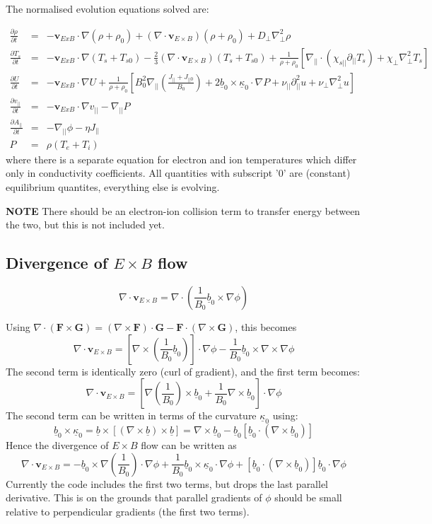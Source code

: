 \documentclass[12pt]{article}
\newcommand{\deriv}[2]{\ensuremath{\frac{\partial #1}{\partial #2}}}
\newcommand{\Vec}[1]{\ensuremath{\mathbf{#1}}}
\newcommand{\bvec}{\ensuremath{\underline{b}}}
\newcommand{\kvec}{\ensuremath{\underline{\kappa}}}
\newcommand{\apar}{\ensuremath{A_{||}}}
\begin{document}
The normalised evolution equations solved are:

\begin{eqnarray*}
  \deriv{\rho}{t} &=& -\Vec{v}_{ExB}\cdot\nabla\left(\rho + \rho_0\right) + \left(\nabla\cdot\Vec{v}_{E\times B}\right)\left(\rho + \rho_0\right) + D_\perp\nabla_\perp^2\rho \\
  \deriv{T_s}{t} &=& -\Vec{v}_{ExB}\cdot\nabla\left(T_s + T_{s0}\right) - \frac{2}{3}\left(\nabla\cdot\Vec{v}_{E\times B}\right)\left(T_s + T_{s0}\right) + \frac{1}{\rho + \rho_0}\left[ \nabla_{||}\cdot\left(\chi_{s||}\partial_{||}T_s\right) + \chi_\perp\nabla_\perp^2T_s\right] \\
  \deriv{U}{t} &=& -\Vec{v}_{ExB}\cdot\nabla U + \frac{1}{\rho+\rho_0}\left[ B_0^2\nabla_{||}\left(\frac{J_{||}+J_{||0}}{B_0}\right) + 2\bvec_0\times\kvec_0\cdot\nabla P + \nu_{||}\partial_{||}^2u + \nu_\perp\nabla_\perp^2u\right] \\
\deriv{v_{||}}{t} &=& -\Vec{v}_{ExB}\cdot\nabla v_{||} - \nabla_{||} P \\
\deriv{\apar}{t} &=& -\nabla_{||}\phi - \eta J_{||} \\
P &=& \rho\left(T_e + T_i\right)
\end{eqnarray*}
where there is a separate equation for electron and ion temperatures which
differ only in conductivity coefficients. All quantities with subscript '0'
are (constant) equilibrium quantites, everything else is evolving.

 {\bf NOTE} There should be an
electron-ion collision term to transfer energy between the two, but this
is not included yet.
 
\subsection{Divergence of $E\times B$ flow}

\[
\nabla\cdot\Vec{v}_{E\times B} = \nabla\cdot\left(\frac{1}{B_0}\bvec_0\times\nabla\phi\right)
\]

Using $\nabla\cdot\left(\Vec{F}\times\Vec{G}\right) = \left(\nabla\times\Vec{F}\right)\cdot\Vec{G} - \Vec{F}\cdot\left(\nabla\times\Vec{G}\right)$, this becomes
\[
\nabla\cdot\Vec{v}_{E\times B} = \left[\nabla\times\left(\frac{1}{B_0}\bvec_0\right)\right]\cdot\nabla\phi - \frac{1}{B_0}\bvec_0\times\nabla\times\nabla\phi
\]
The second term is identically zero (curl of gradient), and the first term becomes:
\[
\nabla\cdot\Vec{v}_{E\times B} = \left[\nabla\left(\frac{1}{B_0}\right)\times\bvec_0 + \frac{1}{B_0}\nabla\times\bvec_0\right]\cdot\nabla\phi
\]
The second term can be written in terms of the curvature $\kvec_0$ using:
\[
\bvec_0\times\kvec_0 = \bvec\times\left[\left(\nabla\times\bvec\right)\times\bvec\right] = \nabla\times\bvec_0 - \bvec_0\left[\bvec_0\cdot\left(\nabla\times\bvec_0\right)\right]
\]
Hence the divergence of $E\times B$ flow can be written as
\[
\nabla\cdot\Vec{v}_{E\times B} = -\bvec_0\times\nabla\left(\frac{1}{B_0}\right)\cdot\nabla\phi + \frac{1}{B_0}\bvec_0\times\kvec_0\cdot\nabla\phi + \left[\bvec_0\cdot\left(\nabla\times\bvec_0\right)\right]\bvec_0\cdot\nabla\phi
\]
Currently the code includes the first two terms, but drops the last parallel
derivative. This is on the grounds that parallel gradients of $\phi$ should
be small relative to perpendicular gradients (the first two terms).
\end{document}
